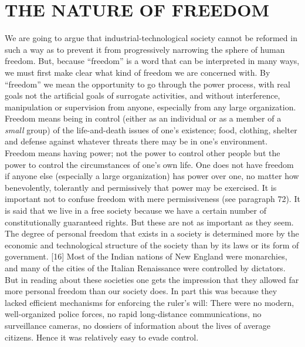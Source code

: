 \chapter{THE NATURE OF FREEDOM}

 We are going to argue that industrial-technological society cannot be reformed in such a way as to prevent it from progressively narrowing the sphere of human freedom. But, because “freedom” is a word that can be interpreted in many ways, we must first make clear what kind of freedom we are concerned with.
 By “freedom” we mean the opportunity to go through the power process, with real goals not the artificial goals of surrogate activities, and without interference, manipulation or supervision from anyone, especially from any large organization. Freedom means being in control (either as an individual or as a member of a {\em small} group) of the life-and-death issues of one’s existence; food, clothing, shelter and defense against whatever threats there may be in one’s environment. Freedom means having power; not the power to control other people but the power to control the circumstances of one’s own life. One does not have freedom if anyone else (especially a large organization) has power over one, no matter how benevolently, tolerantly and permissively that power may be exercised. It is important not to confuse freedom with mere permissiveness (see paragraph 72).
 It is said that we live in a free society because we have a certain number of constitutionally guaranteed rights. But these are not as important as they seem. The degree of personal freedom that exists in a society is determined more by the economic and technological structure of the society than by its laws or its form of government. [16] Most of the Indian nations of New England were monarchies, and many of the cities of the Italian Renaissance were controlled by dictators. But in reading about these societies one gets the impression that they allowed far more personal freedom than our society does. In part this was because they lacked efficient mechanisms for enforcing the ruler’s will: There were no modern, well-organized police forces, no rapid long-distance communications, no surveillance cameras, no dossiers of information about the lives of average citizens. Hence it was relatively easy to evade control.
